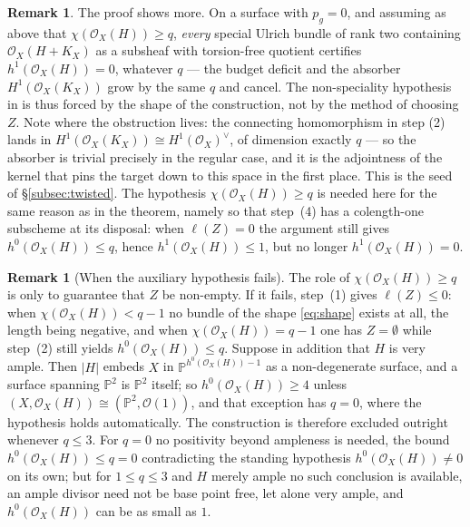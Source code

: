 \documentclass{amsart}
\theoremstyle{definition}
\newtheorem{remark}[theorem]{Remark}
\newcommand{\OO}{\mathcal{O}}
\newcommand{\PP}{\mathbb{P}}
\newcommand{\len}{\ell}
\begin{document}
\begin{remark}\label{rem:nogo-more}
The proof shows more. On a surface with $p_g=0$, and assuming as above that $\chi(\OO_X(H))\ge q$, \emph{every} special Ulrich bundle of rank two containing $\OO_X(H+K_X)$ as a subsheaf with torsion-free quotient certifies $h^1(\OO_X(H))=0$, whatever $q$ --- the budget deficit and the absorber $H^1(\OO_X(K_X))$ grow by the same $q$ and cancel. The non-speciality hypothesis in \cite{Bea16b,Cas17,Cas22} is thus forced by the shape of the construction, not by the method of choosing $Z$. Note where the obstruction lives: the connecting homomorphism in step (2) lands in $H^1(\OO_X(K_X))\cong H^1(\OO_X)^\vee$, of dimension exactly $q$ --- so the absorber is trivial precisely in the regular case, and it is the adjointness of the kernel that pins the target down to this space in the first place. This is the seed of \S\ref{subsec:twisted}. The hypothesis $\chi(\OO_X(H))\ge q$ is needed here for the same reason as in the theorem, namely so that step~(4) has a colength-one subscheme at its disposal: when $\len(Z)=0$ the argument still gives $h^0(\OO_X(H))\le q$, hence $h^1(\OO_X(H))\le1$, but no longer $h^1(\OO_X(H))=0$.
\end{remark}

\begin{remark}[When the auxiliary hypothesis fails]\label{rem:nogo-vacuous}
The role of $\chi(\OO_X(H))\ge q$ is only to guarantee that $Z$ be non-empty. If it fails, step~(1) gives $\len(Z)\le0$: when $\chi(\OO_X(H))<q-1$ no bundle of the shape \eqref{eq:shape} exists at all, the length being negative, and when $\chi(\OO_X(H))=q-1$ one has $Z=\emptyset$ while step~(2) still yields $h^0(\OO_X(H))\le q$. Suppose in addition that $H$ is very ample. Then $|H|$ embeds $X$ in $\PP^{h^0(\OO_X(H))-1}$ as a non-degenerate surface, and a surface spanning $\PP^2$ is $\PP^2$ itself; so $h^0(\OO_X(H))\ge4$ unless $(X,\OO_X(H))\cong(\PP^2,\OO(1))$, and that exception has $q=0$, where the hypothesis holds automatically. The construction is therefore excluded outright whenever $q\le3$. For $q=0$ no positivity beyond ampleness is needed, the bound $h^0(\OO_X(H))\le q=0$ contradicting the standing hypothesis $h^0(\OO_X(H))\neq0$ on its own; but for $1\le q\le3$ and $H$ merely ample no such conclusion is available, an ample divisor need not be base point free, let alone very ample, and $h^0(\OO_X(H))$ can be as small as $1$.
\end{remark}
\end{document}
